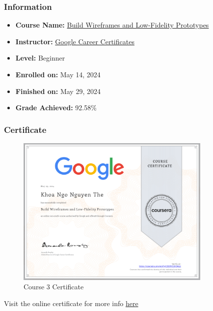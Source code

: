 \subsubsection{Information}
\begin{itemize}
	\item \textbf{Course Name:} \href{https://www.coursera.org/learn/wireframes-low-fidelity-prototypes}{Build Wireframes and Low-Fidelity Prototypes}
	\item \textbf{Instructor:} \href{https://www.coursera.org/instructor/google-career-certificates}{Google Career Certificates}
	\item \textbf{Level:} Beginner
	\item \textbf{Enrolled on:} May 14, 2024
	\item \textbf{Finished on:} May 29, 2024
	\item \textbf{Grade Achieved:} 92.58\%
\end{itemize}

\subsubsection{Certificate}
\begin{flushleft}
	\begin{figure}[!ht]
		\centering
		\includegraphics[width=0.85\textwidth]{imgs/Course3.png}
		\caption{Course 3 Certificate}
	\end{figure}

	Visit the online certificate for more info \href{https://www.coursera.org/account/accomplishments/verify/CB39VS3Q3ALU}{here}
\end{flushleft}

